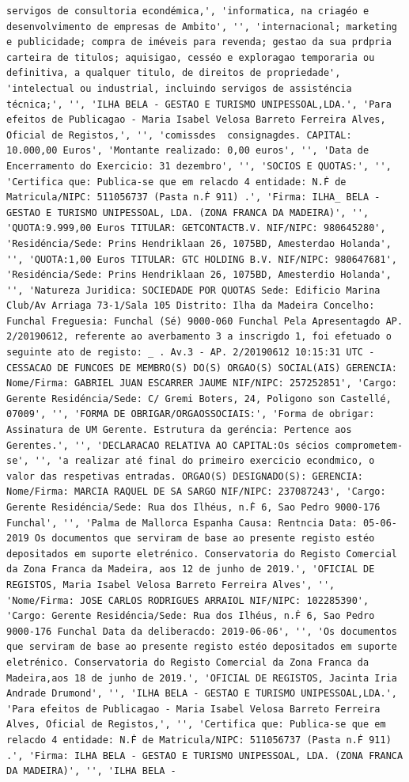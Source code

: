 \documentclass[
  12pt,
]{article}
\begin{document}
\begin{verbatim}
servigos de consultoria econdémica,', 'informatica, na criagéo e desenvolvimento de empresas de Ambito', '', 'internacional; marketing e publicidade; compra de iméveis para revenda; gestao da sua prdpria carteira de titulos; aquisigao, cesséo e exploragao temporaria ou definitiva, a qualquer titulo, de direitos de propriedade', 'intelectual ou industrial, incluindo servigos de assisténcia técnica;', '', 'ILHA BELA - GESTAO E TURISMO UNIPESSOAL,LDA.', 'Para efeitos de Publicagao - Maria Isabel Velosa Barreto Ferreira Alves, Oficial de Registos,', '', 'comissdes  consignagdes. CAPITAL: 10.000,00 Euros', 'Montante realizado: 0,00 euros', '', 'Data de Encerramento do Exercicio: 31 dezembro', '', 'SOCIOS E QUOTAS:', '', 'Certifica que: Publica-se que em relacdo 4 entidade: N.Ḟ de Matricula/NIPC: 511056737 (Pasta n.Ḟ 911) .', 'Firma: ILHA_ BELA - GESTAO E TURISMO UNIPESSOAL, LDA. (ZONA FRANCA DA MADEIRA)', '', 'QUOTA:9.999,00 Euros TITULAR: GETCONTACTB.V. NIF/NIPC: 980645280', 'Residéncia/Sede: Prins Hendriklaan 26, 1075BD, Amesterdao Holanda', '', 'QUOTA:1,00 Euros TITULAR: GTC HOLDING B.V. NIF/NIPC: 980647681', 'Residéncia/Sede: Prins Hendriklaan 26, 1075BD, Amesterdio Holanda', '', 'Natureza Juridica: SOCIEDADE POR QUOTAS Sede: Edificio Marina Club/Av Arriaga 73-1/Sala 105 Distrito: Ilha da Madeira Concelho: Funchal Freguesia: Funchal (Sé) 9000-060 Funchal Pela Apresentagdo AP. 2/20190612, referente ao averbamento 3 a inscrigdo 1, foi efetuado o seguinte ato de registo: _ . Av.3 - AP. 2/20190612 10:15:31 UTC - CESSACAO DE FUNCOES DE MEMBRO(S) DO(S) ORGAO(S) SOCIAL(AIS) GERENCIA: Nome/Firma: GABRIEL JUAN ESCARRER JAUME NIF/NIPC: 257252851', 'Cargo: Gerente Residéncia/Sede: C/ Gremi Boters, 24, Poligono son Castellé, 07009', '', 'FORMA DE OBRIGAR/ORGAOSSOCIAIS:', 'Forma de obrigar: Assinatura de UM Gerente. Estrutura da geréncia: Pertence aos Gerentes.', '', 'DECLARACAO RELATIVA AO CAPITAL:Os sécios comprometem-se', '', 'a realizar até final do primeiro exercicio econdmico, o valor das respetivas entradas. ORGAO(S) DESIGNADO(S): GERENCIA: Nome/Firma: MARCIA RAQUEL DE SA SARGO NIF/NIPC: 237087243', 'Cargo: Gerente Residéncia/Sede: Rua dos Ilhéus, n.Ḟ 6, Sao Pedro 9000-176 Funchal', '', 'Palma de Mallorca Espanha Causa: Rentncia Data: 05-06-2019 Os documentos que serviram de base ao presente registo estéo depositados em suporte eletrénico. Conservatoria do Registo Comercial da Zona Franca da Madeira, aos 12 de junho de 2019.', 'OFICIAL DE REGISTOS, Maria Isabel Velosa Barreto Ferreira Alves', '', 'Nome/Firma: JOSE CARLOS RODRIGUES ARRAIOL NIF/NIPC: 102285390', 'Cargo: Gerente Residéncia/Sede: Rua dos Ilhéus, n.Ḟ 6, Sao Pedro 9000-176 Funchal Data da deliberacdo: 2019-06-06', '', 'Os documentos que serviram de base ao presente registo estéo depositados em suporte eletrénico. Conservatoria do Registo Comercial da Zona Franca da Madeira,aos 18 de junho de 2019.', 'OFICIAL DE REGISTOS, Jacinta Iria Andrade Drumond', '', 'ILHA BELA - GESTAO E TURISMO UNIPESSOAL,LDA.', 'Para efeitos de Publicagao - Maria Isabel Velosa Barreto Ferreira Alves, Oficial de Registos,', '', 'Certifica que: Publica-se que em relacdo 4 entidade: N.Ḟ de Matricula/NIPC: 511056737 (Pasta n.Ḟ 911) .', 'Firma: ILHA BELA - GESTAO E TURISMO UNIPESSOAL, LDA. (ZONA FRANCA DA MADEIRA)', '', 'ILHA BELA - 
\end{verbatim}
\end{document}
